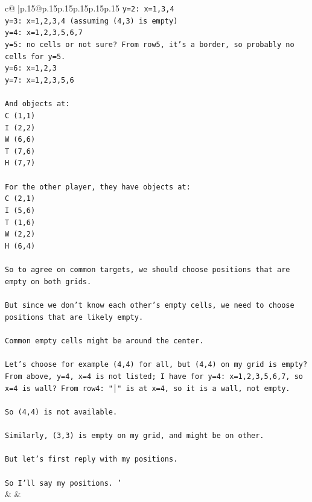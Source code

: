 \documentclass{article}
\begin{document}
{\begin{supertabular}{c@{$\;$}|p{.15\linewidth}@{}p{.15\linewidth}p{.15\linewidth}p{.15\linewidth}p{.15\linewidth}p{.15\linewidth}}
{{{\texttt{y=2: x=1,3,4} \\
\texttt{y=3: x=1,2,3,4  (assuming (4,3) is empty)} \\
\texttt{y=4: x=1,2,3,5,6,7} \\
\texttt{y=5: no cells or not sure? From row5, it's a border, so probably no cells for y=5.} \\
\texttt{y=6: x=1,2,3} \\
\texttt{y=7: x=1,2,3,5,6} \\
\\ 
\texttt{And objects at:} \\
\texttt{C (1,1)} \\
\texttt{I (2,2)} \\
\texttt{W (6,6)} \\
\texttt{T (7,6)} \\
\texttt{H (7,7)} \\
\\ 
\texttt{For the other player, they have objects at:} \\
\texttt{C (2,1)} \\
\texttt{I (5,6)} \\
\texttt{T (1,6)} \\
\texttt{W (2,2)} \\
\texttt{H (6,4)} \\
\\ 
\texttt{So to agree on common targets, we should choose positions that are empty on both grids.} \\
\\ 
\texttt{But since we don't know each other's empty cells, we need to choose positions that are likely empty.} \\
\\ 
\texttt{Common empty cells might be around the center.} \\
\\ 
\texttt{Let's choose for example (4,4) for all, but (4,4) on my grid is empty? From above, y=4, x=4 is not listed; I have for y=4: x=1,2,3,5,6,7, so x=4 is wall? From row4: "│" is at x=4, so it is a wall, not empty.} \\
\\ 
\texttt{So (4,4) is not available.} \\
\\ 
\texttt{Similarly, (3,3) is empty on my grid, and might be on other.} \\
\\ 
\texttt{But let's first reply with my positions.} \\
\\ 
\texttt{So I'll say my positions.         '} \\
            }
        }
    }
    & & \\ \\


\end{supertabular}}
\end{document}
